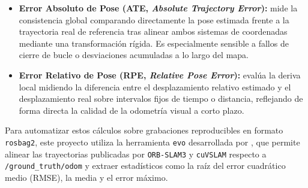 \begin{itemize}
  \item \textbf{Error Absoluto de Pose (ATE, \textit{Absolute Trajectory Error}):} mide la consistencia global comparando directamente la pose estimada frente a la trayectoria real de referencia tras alinear ambos sistemas de coordenadas mediante una transformación rígida. Es especialmente sensible a fallos de cierre de bucle o desviaciones acumuladas a lo largo del mapa.
  \item \textbf{Error Relativo de Pose (RPE, \textit{Relative Pose Error}):} evalúa la deriva local midiendo la diferencia entre el desplazamiento relativo estimado y el desplazamiento real sobre intervalos fijos de tiempo o distancia, reflejando de forma directa la calidad de la odometría visual a corto plazo.
\end{itemize}

Para automatizar estos cálculos sobre grabaciones reproducibles en formato \texttt{rosbag2}, este proyecto utiliza la herramienta \texttt{evo} desarrollada por \textcite{grupp2017evo}, que permite alinear las trayectorias publicadas por \texttt{ORB-SLAM3} y \texttt{cuVSLAM} respecto a \texttt{/ground\_truth/odom} y extraer estadísticos como la raíz del error cuadrático medio (RMSE), la media y el error máximo.

